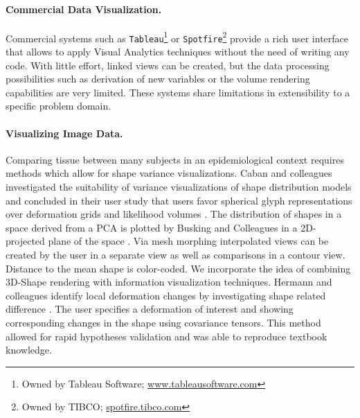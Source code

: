 \documentclass[journal]{style/vgtc} 			          %
\begin{document}
\paragraph{Commercial Data Visualization.}
Commercial systems such as \texttt{Tableau}\footnote{Owned by Tableau Software; \url{www.tableausoftware.com}} or \texttt{Spotfire}\footnote{Owned by TIBCO; \url{spotfire.tibco.com}} provide a rich user interface that allows to apply Visual Analytics techniques without the need of writing any code.
%
With little effort, linked views can be created, but the data processing possibilities such as derivation of new variables or the volume rendering capabilities are very limited.
%
These systems share limitations in extensibility to a specific problem domain.
\paragraph{Visualizing Image Data.}
Comparing tissue between many subjects in an epidemiological context requires methods which allow for shape variance visualizations.
%
Caban and colleagues investigated the suitability of variance visualizations of shape distribution models and concluded in their user study that users favor spherical glyph representations over deformation grids and likelihood volumes \cite{Caban2011}.
%
The distribution of shapes in a space derived from a PCA is plotted by Busking and Colleagues in a 2D-projected plane of the space \cite{Busking2010a}.
%
Via mesh morphing interpolated views can be created by the user in a separate view as well as comparisons in a contour view.
%
Distance to the mean shape is color-coded.
%
We incorporate the idea of combining 3D-Shape rendering with information visualization techniques.
%
%
%
Hermann and colleagues identify local deformation changes by investigating shape related difference \cite{Hermann2014}. 
%
The user specifies a deformation of interest and showing corresponding changes in the shape using covariance tensors.
%
This method allowed for rapid hypotheses validation and was able to reproduce textbook knowledge.
%
%
%
\end{document}

